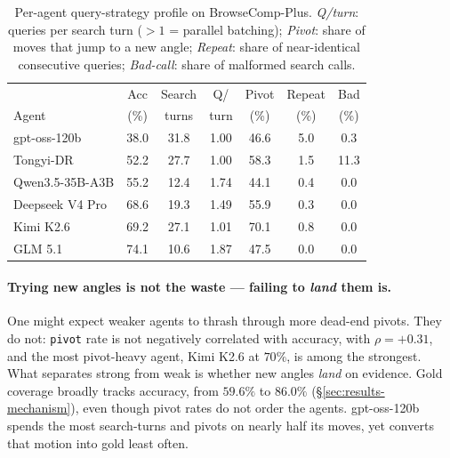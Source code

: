 \begin{table}[t]
\centering
\small
\setlength{\tabcolsep}{3pt}
\caption{Per-agent query-strategy profile on BrowseComp-Plus.  \emph{Q/turn}: queries per search turn ($>1$ = parallel batching); \emph{Pivot}: share of moves that jump to a new angle; \emph{Repeat}: share of near-identical consecutive queries; \emph{Bad-call}: share of malformed search calls.}
\label{tab:query-discipline}
\begin{tabular}{lcccccc}
\toprule
        & Acc  & Search  & Q/    & Pivot & Repeat & Bad  \\
Agent   & (\%) & turns   & turn  & (\%)  & (\%)   & (\%) \\
\midrule
gpt-oss-120b           & 38.0 & 31.8 & 1.00 & 46.6 & 5.0 &  0.3 \\
Tongyi-DR              & 52.2 & 27.7 & 1.00 & 58.3 & 1.5 & 11.3 \\
Qwen3.5-35B-A3B        & 55.2 & 12.4 & 1.74 & 44.1 & 0.4 &  0.0 \\
Deepseek V4 Pro        & 68.6 & 19.3 & 1.49 & 55.9 & 0.3 &  0.0 \\
Kimi K2.6              & 69.2 & 27.1 & 1.01 & 70.1 & 0.8 &  0.0 \\
GLM 5.1                & 74.1 & 10.6 & 1.87 & 47.5 & 0.0 &  0.0 \\
\bottomrule
\end{tabular}
\end{table}

\paragraph{Trying new angles is not the waste --- failing to \emph{land} them is.} One might expect weaker agents to thrash through more dead-end pivots. They do not: \texttt{pivot} rate is not negatively correlated with accuracy, with $\rho = +0.31$, and the most pivot-heavy agent, Kimi K2.6 at $70\%$, is among the strongest. What separates strong from weak is whether new angles \emph{land} on evidence. Gold coverage broadly tracks accuracy, from $59.6\%$ to $86.0\%$ (§\ref{sec:results-mechanism}), even though pivot rates do not order the agents. gpt-oss-120b spends the most search-turns and pivots on nearly half its moves, yet converts that motion into gold least often.

